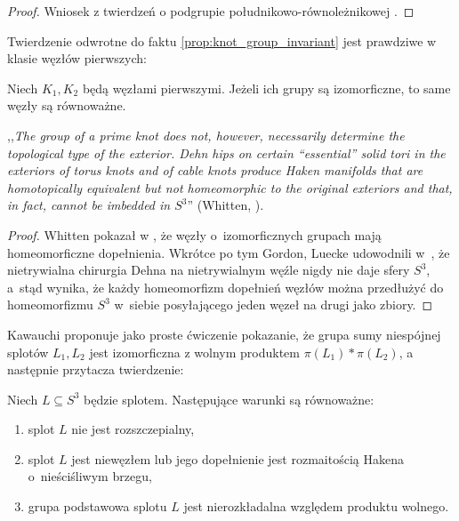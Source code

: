 \begin{proof}
    Wniosek z twierdzeń o podgrupie południkowo-równoleżnikowej \cite[s. 75]{kawauchi96}.
\end{proof}

Twierdzenie odwrotne do faktu \ref{prop:knot_group_invariant} jest prawdziwe w klasie węzłów pierwszych:

\begin{proposition}
    Niech $K_1, K_2$ będą węzłami pierwszymi.
    Jeżeli ich grupy są izomorficzne, to same węzły są równoważne.
\end{proposition}

,,\emph{The group of a prime knot does not, however, necessarily determine the topological type of the exterior. Dehn hips on certain “essential” solid tori in the exteriors of torus knots and of cable knots produce Haken manifolds that are homotopically equivalent but not homeomorphic to the original exteriors and that, in fact, cannot be imbedded in $S^3$}'' (Whitten, \cite{whitten87}).

\begin{proof}
    Whitten pokazał w \cite{whitten87}, że węzły o~izomorficznych grupach mają homeomorficzne dopełnienia.
    Wkrótce po tym Gordon, Luecke udowodnili w~\cite{gordon89}, że nietrywialna chirurgia Dehna na nietrywialnym węźle nigdy nie daje sfery $S^3$, a~stąd wynika, że każdy homeomorfizm dopełnień węzłów można przedłużyć do homeomorfizmu $S^3$ w~siebie posyłającego jeden węzeł na drugi jako zbiory.
\end{proof}

Kawauchi proponuje jako proste ćwiczenie \cite[s. 73]{kawauchi96} pokazanie, że grupa sumy niespójnej splotów $L_1, L_2$ jest izomorficzna z wolnym produktem $\pi(L_1) * \pi(L_2)$, a następnie przytacza twierdzenie:

\begin{proposition}

    Niech $L \subseteq S^3$ będzie splotem.
    Następujące warunki są równoważne:
    \begin{enumerate}
        \item splot $L$ nie jest rozszczepialny,
        \item splot $L$ jest niewęzłem lub jego dopełnienie jest rozmaitością Hakena o~nieściśliwym brzegu,
%
        \item grupa podstawowa splotu $L$ jest nierozkładalna względem produktu wolnego.
    \end{enumerate}
\end{proposition}

